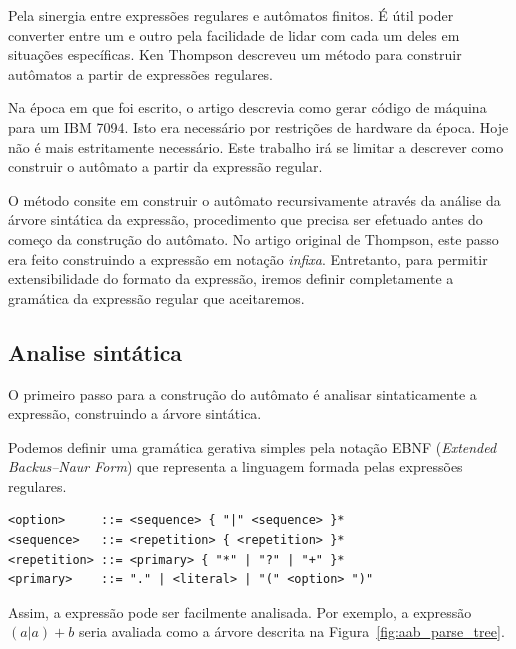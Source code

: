 \documentclass[a4paper,12pt,oneside,onecolumn]{uerj}
\begin{document}
Pela sinergia entre expressões regulares e autômatos finitos. É útil poder converter entre um e outro pela facilidade de lidar com cada um deles em situações específicas. Ken Thompson \cite{bib:Thompson68} descreveu um método para construir autômatos a partir de expressões regulares.

Na época em que foi escrito, o artigo descrevia como gerar código de máquina para um IBM 7094. Isto era necessário por restrições de hardware da época. Hoje não é mais estritamente necessário. Este trabalho irá se limitar a descrever como construir o autômato a partir da expressão regular.

O método consite em construir o autômato recursivamente através da análise da árvore sintática da expressão, procedimento que precisa ser efetuado antes do começo da construção do autômato. No artigo original de Thompson, este passo era feito construindo a expressão em notação \emph{infixa}. Entretanto, para permitir extensibilidade do formato da expressão, iremos definir completamente a gramática da expressão regular que aceitaremos.

\subsection{Analise sintática}

O primeiro passo para a construção do autômato é analisar sintaticamente a expressão, construindo a árvore sintática. 

Podemos definir uma gramática gerativa simples pela notação EBNF (\emph{Extended Backus–Naur Form}) que representa a linguagem formada pelas expressões regulares.

\begin{verbatim}
<option>     ::= <sequence> { "|" <sequence> }*
<sequence>   ::= <repetition> { <repetition> }*
<repetition> ::= <primary> { "*" | "?" | "+" }*
<primary>    ::= "." | <literal> | "(" <option> ")"
\end{verbatim}

Assim, a expressão pode ser facilmente analisada. Por exemplo, a expressão $(a|a)+b$ seria avaliada como a árvore descrita na Figura~\ref{fig:aab_parse_tree}.
\end{document}

